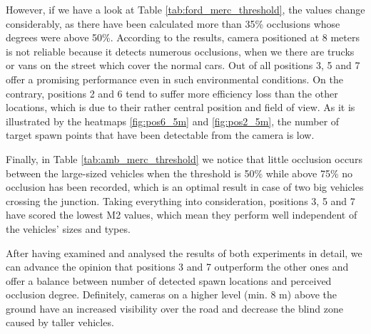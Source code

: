 However, if we have a look at Table \ref{tab:ford_merc_threshold}, the values change considerably, as there have been calculated more than 35\% occlusions whose degrees were above 50\%. According to the results, camera positioned at 8 meters is not reliable because it detects numerous occlusions, when we there are trucks or vans on the street which cover the normal cars. Out of all positions 3, 5 and 7 offer a promising performance even in such environmental conditions. On the contrary, positions 2 and 6 tend to suffer more efficiency loss than the other locations, which is due to their rather central position and field of view. As it is illustrated by the heatmaps \ref{fig:pos6_5m} and \ref{fig:pos2_5m}, the number of target spawn points that have been detectable from the camera is low.

Finally, in Table \ref{tab:amb_merc_threshold} we notice that little occlusion occurs between the large-sized vehicles when the threshold is 50\% while above 75\% no occlusion has been recorded, which is an optimal result in case of two big vehicles crossing the junction. Taking everything into consideration, positions 3, 5 and 7 have scored the lowest M2 values, which mean they perform well independent of the vehicles' sizes and types.

After having examined and analysed the results of both experiments in detail, we can advance the opinion that positions 3 and 7 outperform the other ones and offer a balance between number of detected spawn locations and perceived occlusion degree. Definitely, cameras on a higher level (min. 8 m) above the ground have an increased visibility over the road and decrease the blind zone caused by taller vehicles. 

